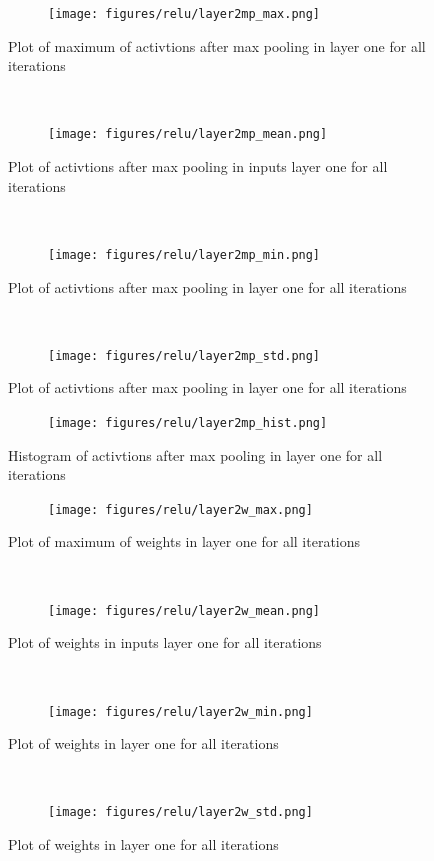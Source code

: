 \documentclass[]{article}
\begin{document}
\begin{figure}[ht]
    \centering
    \begin{subfigure}
        \centering
        \texttt{[image: figures/relu/layer2mp\_max.png]}
    \end{subfigure}%
    \caption{Plot of maximum of activtions after max pooling in layer one for all iterations}
 \label{fig:/layer2mp_max}
    ~ 
    \centering
    \begin{subfigure}
        \centering
        \texttt{[image: figures/relu/layer2mp\_mean.png]}
    \end{subfigure}%
    \caption{Plot of activtions after max pooling in inputs layer one for all iterations}
 \label{fig:/layer2mp_mean}
    ~ 
    \centering
    \begin{subfigure}
        \centering
        \texttt{[image: figures/relu/layer2mp\_min.png]}
    \end{subfigure}%
    \caption{Plot of activtions after max pooling in layer one for all iterations}
 \label{fig:/layer2mp_min}
    ~ 
    \centering
    \begin{subfigure}
        \centering
        \texttt{[image: figures/relu/layer2mp\_std.png]}
    \end{subfigure}%
    \caption{Plot of activtions after max pooling in layer one for all iterations}
 \label{fig:/layer2mp_std}
\end{figure}

\begin{figure}
    \centering
    \begin{subfigure}
        \centering
        \texttt{[image: figures/relu/layer2mp\_hist.png]}
    \end{subfigure}%
    \caption{Histogram of activtions after max pooling in layer one for all iterations}
 \label{fig:/layer2mp_hist}
\end{figure}

\begin{figure}[ht]
    \centering
    \begin{subfigure}
        \centering
        \texttt{[image: figures/relu/layer2w\_max.png]}
    \end{subfigure}%
    \caption{Plot of maximum of weights in layer one for all iterations}
 \label{fig:/layer2w_max}
    ~ 
    \centering
    \begin{subfigure}
        \centering
        \texttt{[image: figures/relu/layer2w\_mean.png]}
    \end{subfigure}%
    \caption{Plot of weights in inputs layer one for all iterations}
 \label{fig:/layer2w_mean}
    ~ 
    \centering
    \begin{subfigure}
        \centering
        \texttt{[image: figures/relu/layer2w\_min.png]}
    \end{subfigure}%
    \caption{Plot of weights in layer one for all iterations}
 \label{fig:/layer2w_min}
    ~ 
    \centering
    \begin{subfigure}
        \centering
        \texttt{[image: figures/relu/layer2w\_std.png]}
    \end{subfigure}%
    \caption{Plot of weights in layer one for all iterations}
 \label{fig:/layer2w_std}
\end{figure}
\end{document}
